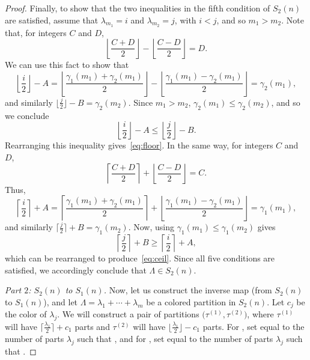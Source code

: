 \documentclass[10pt,a4paper]{amsart}
\numberwithin{equation}{section}
\theoremstyle{definition}
\begin{document}
\begin{proof}
Finally, to show that the two inequalities in the fifth condition of $S_2(n)$ are satisfied, assume that $\lambda_{m_1}=i$ and $\lambda_{m_2}=j$, with $i<j$, and so $m_1>m_2$. Note that, for integers $C$ and $D$,
\[ \left\lfloor\frac{C+D}2\right\rfloor-\left\lfloor\frac{C-D}2\right\rfloor=D.\] We can use this fact to show that
\begin{equation*}
\left\lfloor\frac i2\right\rfloor-A=\left\lfloor\frac {\gamma_1(m_1)+\gamma_2(m_1)}2\right\rfloor-\left\lfloor\frac {\gamma_1(m_1)-\gamma_2(m_1)}2\right\rfloor=\gamma_2(m_1),
\end{equation*}
and similarly $\bigl\lfloor\frac j2\bigr\rfloor-B=\gamma_2(m_2)$. Since $m_1>m_2$, $\gamma_2(m_1)\le\gamma_2(m_2)$, and so we conclude
\begin{equation*}
\left\lfloor\frac i2\right\rfloor-A\le\left\lfloor\frac j2\right\rfloor-B.
\end{equation*}
Rearranging this inequality gives~\eqref{eq:floor}. In the same way, for integers $C$ and $D$,
\[ \left\lceil\frac{C+D}2\right\rceil+\left\lfloor\frac{C-D}2\right\rfloor=C.\] Thus,
\begin{equation*}
\left\lceil\frac i2\right\rceil+A=\left\lceil\frac{\gamma_1(m_1)+\gamma_2(m_1)}2\right\rceil+\left\lfloor\frac {\gamma_1(m_1)-\gamma_2(m_1)}2\right\rfloor=\gamma_1(m_1),
\end{equation*}
and similarly $\bigl\lceil\frac j2\bigr\rceil+B=\gamma_1(m_2)$. Now, using $\gamma_1(m_1)\le\gamma_1(m_2)$ gives
\begin{equation*}
\left\lceil\frac j2\right\rceil+B \ge \left\lceil\frac i2\right\rceil+A,
\end{equation*}
which can be rearranged to produce~\eqref{eq:ceil}. Since all five conditions are satisfied, we accordingly conclude that $\Lambda \in S_2(n)$.

{\it Part $2$: $S_2(n)$ to $S_1(n)$.} Now, let us construct the inverse map (from $S_2(n)$ to $S_1(n)$), and let $\Lambda=\lambda_1+\cdots+\lambda_m$ be a colored partition in $S_2(n)$. Let $c_j$ be the color of $\lambda_j$. We will construct a pair of partitions $\bigl(\tau^{(1)},\tau^{(2)}\bigr)$, where $\tau^{(1)}$ will have $\bigl\lceil\frac {\lambda_1}2\bigr\rceil+c_1$ parts and $\tau^{(2)}$ will have $\bigl\lfloor\frac {\lambda_1}2\bigr\rfloor-c_1$ parts. For , set  equal to the number of parts $\lambda_j$ such that , and for , set  equal to the number of parts $\lambda_j$ such that .


\end{proof}
\end{document}
